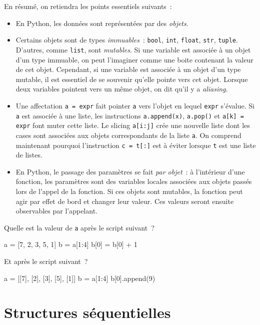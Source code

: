 \documentclass{magnoliaold}
\begin{document}
En résumé, on retiendra les points essentiels suivants~:
\begin{itemize}
\item En Python, les données sont représentées par des \emph{objets}.
\item Certains objets sont de types \emph{immuables}~: \verb_bool_, \verb_int_, \verb_float_, \verb_str_, \verb_tuple_.
  D'autres, comme \verb!list!, sont \emph{mutables}. Si une variable est associée à un objet d'un
  type immuable, on peut l'imaginer comme une boite contenant la valeur de cet objet.
  Cependant, si une variable est associée à un objet d'un type mutable, il est essentiel de se souvenir
  qu'elle pointe vers cet objet.
  Lorsque deux variables pointent vers un même objet, on dit qu'il y a \emph{aliasing}.
\item Une affectation \verb!a = expr! fait pointer \verb!a! vers l'objet en lequel \verb!expr! s'évalue.
  Si \verb!a! est associée à une liste, les instructions \verb!a.append(x)!, \verb!a.pop()! et
  \verb!a[k] = expr! font muter cette liste. Le slicing \verb!a[i:j]! crée une nouvelle liste
  dont les cases sont associées aux objets correspondants de la liste \verb!a!. On comprend maintenant pourquoi l'instruction \verb!c = t[:]! est
  à éviter lorsque \verb!t! est une liste de listes.
\item En Python, le passage des paramètres se fait \emph{par objet}~: à l'intérieur d'une fonction, les
  paramètres sont des variables locales associées aux objets passés lors de l'appel
  de la fonction. Si ces objets sont mutables, la fonction peut agir par effet de bord et changer
  leur valeur. Ces valeurs seront ensuite observables par l'appelant.
\end{itemize}

\vspace{2ex}
\begin{exoUnique}
\exo
\begin{questions}
\question Quelle est la valeur de \verb!a! après le script suivant~?
\begin{pythoncode}
a = [7, 2, 3, 5, 1]
b = a[1:4]
b[0] = b[0] + 1
\end{pythoncode}
\question Et après le script suivant~?
\begin{pythoncode}
a = [[7], [2], [3], [5], [1]]
b = a[1:4]
b[0].append(9)
\end{pythoncode}
\end{questions}
\end{exoUnique}


\section{Structures séquentielles}
\end{document}
